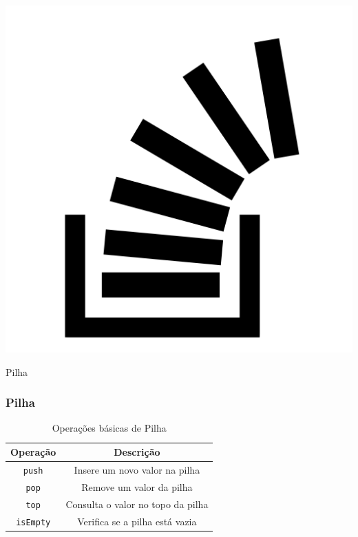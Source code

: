 \documentclass{beamer}
\begin{document}
\begin{frame}
	\begin{center}
        \includegraphics[scale=0.2]{images/stack.png}

		\Huge Pilha
	\end{center}
\end{frame}

\begin{frame}
	\frametitle{Pilha}
    \begin{table}
        \caption{Operações básicas de Pilha}
        \label{tab:pilha}
        \begin{tabular}{| c | c |}
            \hline
            Operação & Descrição \\ \hline
            \texttt{push} & Insere um novo valor na pilha \\ \hline
            \texttt{pop} & Remove um valor da pilha \\ \hline
            \texttt{top} & Consulta o valor no topo da pilha \\ \hline
            \texttt{isEmpty} & Verifica se a pilha está vazia \\ \hline
        \end{tabular}
    \end{table}
\end{frame}
\end{document}
